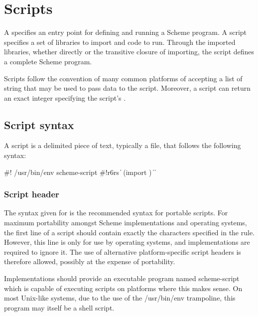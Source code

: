\chapter{Scripts}
\label{scriptchapter}

A  specifies an entry point for defining and running
a Scheme program.  A script specifies a set of libraries to import and
code to run.  Through the imported libraries, whether directly or the
transitive closure of importing, the script defines a complete Scheme
program.

Scripts follow the convention of many common platforms of accepting a
list of string  that may be used to
pass data to the script.  Moreover, a script can return an exact
integer specifying the script's .

\section{Script syntax}

A script is a delimited piece of text, typically a file, that follows
the following syntax:

\begin{grammar}
 \: \#! /usr/bin/env scheme-script
  \> 
  \> 
 \: \#!r6rs  
  \> \|  
 \: (import )
 \:  
 \: 
\> \| 
\> \| 
\end{grammar}

\subsection{Script header}

The syntax given for  is the recommended syntax for 
portable scripts.  For maximum portability amongst Scheme implementations
and operating systems, the first line of a script should contain exactly 
the characters specified in the rule.  However, this line is only for use 
by operating systems, and implementations are required to ignore it.  
The use of alternative platform-specific script headers is therefore 
allowed, possibly at the expense of portability.

Implementations should provide an executable program named {\cf scheme-script}
which is capable of executing scripts on platforms where this makes
sense.  On most Unix-like systems, due to the 
use of the {\cf /usr/bin/env} trampoline, this program may itself be a shell 
script.

